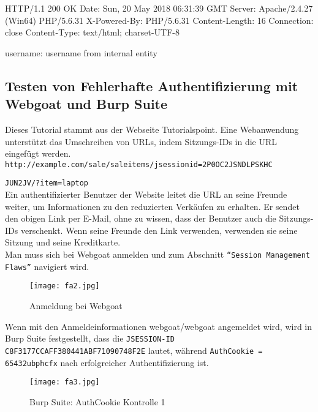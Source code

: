 \begin{LaTeXCode}[caption={Bestätigung der XXE-Schwachstelle},captionpos=b][numbers=none]
	HTTP/1.1 200 OK
	Date: Sun, 20 May 2018 06:31:39 GMT
	Server: Apache/2.4.27 (Win64) PHP/5.6.31
	X-Powered-By: PHP/5.6.31
	Content-Length: 16
	Connection: close
	Content-Type: text/html; charset-UTF-8	
	
	username: username from internal entity\\
\end{LaTeXCode}

\subsection{Testen von Fehlerhafte Authentifizierung mit Webgoat und Burp Suite}
Dieses Tutorial stammt aus der Webseite Tutorialspoint\cite{tpfa15}.
Eine Webanwendung unterstützt das Umschreiben von URLs, indem Sitzungs-IDs in die URL eingefügt werden.\\

\texttt{http://example.com/sale/saleitems/jsessionid=2P0OC2JSNDLPSKHC}

\texttt{JUN2JV/?item=laptop}\\

Ein authentifizierter Benutzer der Website leitet die URL an seine Freunde weiter, um Informationen zu den reduzierten Verkäufen zu erhalten. Er sendet den obigen Link per E-Mail, ohne zu wissen, dass der Benutzer auch die Sitzungs-IDs verschenkt. Wenn seine Freunde den Link verwenden, verwenden sie seine Sitzung und seine Kreditkarte.\\

Man muss sich bei Webgoat anmelden und zum Abschnitt \texttt{"`Session Management Flaws"'} navigiert wird.\\

\newpage

\begin{figure}[h]
	\centering
	\texttt{[image: fa2.jpg]}
	\caption{Anmeldung bei Webgoat}
\end{figure}

Wenn mit den Anmeldeinformationen webgoat/webgoat angemeldet wird, wird in Burp Suite festgestellt, dass die \texttt{JSESSION-ID C8F3177CCAFF380441ABF71090748F2E} lautet, während \texttt{AuthCookie = 65432ubphcfx} nach erfolgreicher Authentifizierung ist.

\begin{figure}[h]
	\centering
	\texttt{[image: fa3.jpg]}
	\caption{Burp Suite: AuthCookie Kontrolle 1}
\end{figure}

